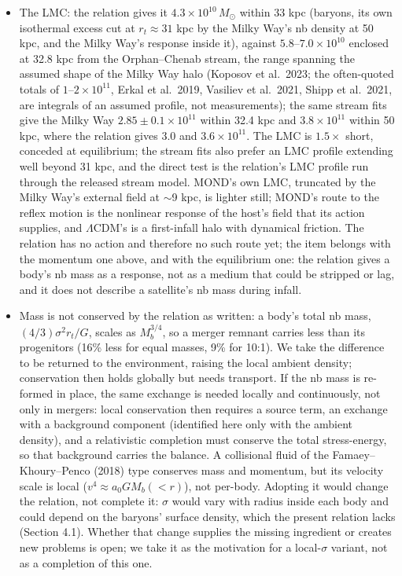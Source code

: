 \documentclass[
  10pt,
]{article}
\begin{document}
\begin{itemize}
\item The LMC: the relation gives it $4.3\times10^{10}\,M_\odot$ within 33 kpc (baryons, its own isothermal excess cut at $r_t\approx31$ kpc by the Milky Way's nb density at 50 kpc, and the Milky Way's response inside it), against $5.8$--$7.0\times10^{10}$ enclosed at 32.8 kpc from the Orphan--Chenab stream, the range spanning the assumed shape of the Milky Way halo (Koposov et al.~2023; the often-quoted totals of $1$--$2\times10^{11}$, Erkal et al.~2019, Vasiliev et al.~2021, Shipp et al.~2021, are integrals of an assumed profile, not measurements); the same stream fits give the Milky Way $2.85\pm0.1\times10^{11}$ within 32.4 kpc and $3.8\times10^{11}$ within 50 kpc, where the relation gives $3.0$ and $3.6\times10^{11}$. The LMC is $1.5\times$ short, conceded at equilibrium; the stream fits also prefer an LMC profile extending well beyond 31 kpc, and the direct test is the relation's LMC profile run through the released stream model. MOND's own LMC, truncated by the Milky Way's external field at $\sim$9 kpc, is lighter still; MOND's route to the reflex motion is the nonlinear response of the host's field that its action supplies, and $\Lambda$CDM's is a first-infall halo with dynamical friction. The relation has no action and therefore no such route yet; the item belongs with the momentum one above, and with the equilibrium one: the relation gives a body's nb mass as a response, not as a medium that could be stripped or lag, and it does not describe a satellite's nb mass during infall.
\item Mass is not conserved by the relation as written: a body's total nb mass, $(4/3)\sigma^2r_t/G$, scales as $M_b^{3/4}$, so a merger remnant carries less than its progenitors (16\% less for equal masses, 9\% for 10:1). We take the difference to be returned to the environment, raising the local ambient density; conservation then holds globally but needs transport. If the nb mass is re-formed in place, the same exchange is needed locally and continuously, not only in mergers: local conservation then requires a source term, an exchange with a background component (identified here only with the ambient density), and a relativistic completion must conserve the total stress-energy, so that background carries the balance. A collisional fluid of the Famaey--Khoury--Penco (2018) type conserves mass and momentum, but its velocity scale is local ($v^4\approx a_0GM_b(<r)$), not per-body. Adopting it would change the relation, not complete it: $\sigma$ would vary with radius inside each body and could depend on the baryons' surface density, which the present relation lacks (Section 4.1). Whether that change supplies the missing ingredient or creates new problems is open; we take it as the motivation for a local-$\sigma$ variant, not as a completion of this one.

\end{itemize}
\end{document}
